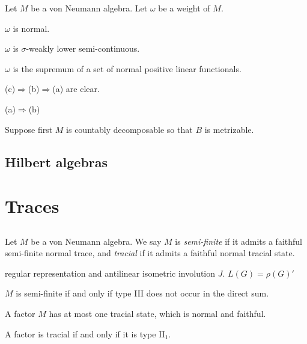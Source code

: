 \documentclass{../../large}
\begin{document}
\begin{prb}
Let $M$ be a von Neumann algebra.
Let $\omega$ be a weight of $M$.
\begin{parts}
\item $\omega$ is normal.
\item $\omega$ is $\sigma$-weakly lower semi-continuous.
\item $\omega$ is the supremum of a set of normal positive linear functionals.
\end{parts}
\end{prb}
\begin{pf}
(c)$\Rightarrow$(b)$\Rightarrow$(a) are clear.

(a)$\Rightarrow$(b)


Suppose first $M$ is countably decomposable so that $B$ is metrizable.


\end{pf}


\section{Hilbert algebras}






\chapter{Traces}

\section{}


\begin{prb}
Let $M$ be a von Neumann algebra.
We say $M$ is \emph{semi-finite} if it admits a faithful semi-finite normal trace, and \emph{tracial} if it admits a faithful normal tracial state.
\begin{parts}
\item regular representation and antilinear isometric involution $J$. $L(G)=\rho(G)'$
\item $M$ is semi-finite if and only if type III does not occur in the direct sum.

\item A factor $M$ has at most one tracial state, which is normal and faithful.
\item A factor is tracial if and only if it is type II$_1$.
\end{parts}
\end{prb}
\end{document}
